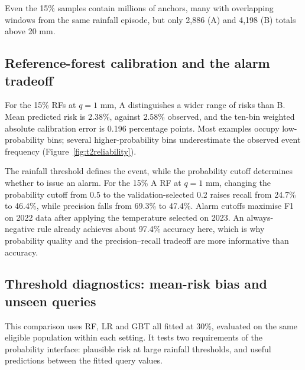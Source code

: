 Even the 15\% samples contain millions of anchors, many with overlapping windows from the same rainfall episode, but only 2,886 (A) and 4,198 (B) totals above 20 mm.

\FloatBarrier
\subsection{Reference-forest calibration and the alarm tradeoff}
For the 15\% RFs at $q=1$ mm, A distinguishes a wider range of risks than B. Mean predicted risk is 2.38\%, against 2.58\% observed, and the ten-bin weighted absolute calibration error is 0.196 percentage points. Most examples occupy low-probability bins; several higher-probability bins underestimate the observed event frequency (Figure~\ref{fig:t2reliability}).

The rainfall threshold defines the event, while the probability cutoff determines whether to issue an alarm. For the 15\% A RF at $q=1$ mm, changing the probability cutoff from 0.5 to the validation-selected 0.2 raises recall from 24.7\% to 46.4\%, while precision falls from 69.3\% to 47.4\%. Alarm cutoffs maximise F1 on 2022 data after applying the temperature selected on 2023. An always-negative rule already achieves about 97.4\% accuracy here, which is why probability quality and the precision--recall tradeoff are more informative than accuracy.

\FloatBarrier
\subsection{Threshold diagnostics: mean-risk bias and unseen queries}
This comparison uses RF, LR and GBT all fitted at 30\%, evaluated on the same eligible population within each setting. It tests two requirements of the probability interface: plausible risk at large rainfall thresholds, and useful predictions between the fitted query values.

